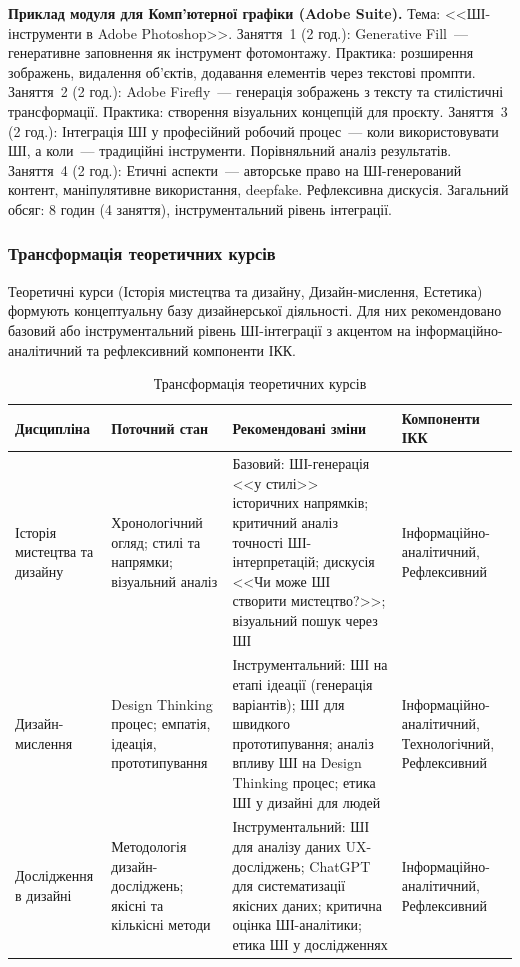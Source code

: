 \textbf{Приклад модуля для Комп'ютерної графіки (Adobe Suite).} Тема: <<ШІ-інструменти в Adobe Photoshop>>. Заняття~1 (2 год.): Generative Fill~--- генеративне заповнення як інструмент фотомонтажу. Практика: розширення зображень, видалення об'єктів, додавання елементів через текстові промпти. Заняття~2 (2 год.): Adobe Firefly~--- генерація зображень з тексту та стилістичні трансформації. Практика: створення візуальних концепцій для проєкту. Заняття~3 (2 год.): Інтеграція ШІ у професійний робочий процес~--- коли використовувати ШІ, а коли~--- традиційні інструменти. Порівняльний аналіз результатів. Заняття~4 (2 год.): Етичні аспекти~--- авторське право на ШІ-генерований контент, маніпулятивне використання, deepfake. Рефлексивна дискусія. Загальний обсяг: 8 годин (4 заняття), інструментальний рівень інтеграції.

\subsubsection{Трансформація теоретичних курсів}\label{sssec:3.2.4}

Теоретичні курси (Історія мистецтва та дизайну, Дизайн-мислення, Естетика) формують концептуальну базу дизайнерської діяльності. Для них рекомендовано базовий або інструментальний рівень ШІ-інтеграції з акцентом на інформаційно-аналітичний та рефлексивний компоненти ІКК.

\begin{table}[htbp]
\centering
\caption{Трансформація теоретичних курсів}\label{tab:theory-transform}
\small
\begin{tabularx}{\textwidth}{@{}p{}p{}p{}p{}@{}}
\toprule
\textbf{Дисципліна} & \textbf{Поточний стан} & \textbf{Рекомендовані зміни} & \textbf{Компоненти ІКК} \\
\midrule
Історія мистецтва та дизайну & Хронологічний огляд; стилі та напрямки; візуальний аналіз & Базовий: ШІ-генерація <<у стилі>> історичних напрямків; критичний аналіз точності ШІ-інтерпретацій; дискусія <<Чи може ШІ створити мистецтво?>>; візуальний пошук через ШІ & Інформаційно-аналітичний, Рефлексивний \\
\addlinespace
Дизайн-мислення & Design Thinking процес; емпатія, ідеація, прототипування & Інструментальний: ШІ на етапі ідеації (генерація варіантів); ШІ для швидкого прототипування; аналіз впливу ШІ на Design Thinking процес; етика ШІ у дизайні для людей & Інформаційно-аналітичний, Технологічний, Рефлексивний \\
\addlinespace
Дослідження в дизайні & Методологія дизайн-досліджень; якісні та кількісні методи & Інструментальний: ШІ для аналізу даних UX-досліджень; ChatGPT для систематизації якісних даних; критична оцінка ШІ-аналітики; етика ШІ у дослідженнях & Інформаційно-аналітичний, Рефлексивний \\
\bottomrule
\end{tabularx}
\end{table}

